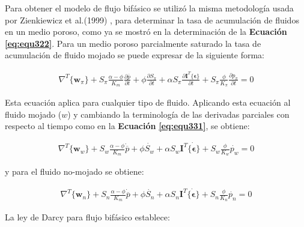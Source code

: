 Para obtener el modelo de flujo bifásico se utilizó la misma metodología usada por Zienkiewicz et al.(1999) \cite{Zienkiewicz1999ComputationalGeomechanics}, para determinar la tasa de acumulación de fluidos en un medio poroso, como ya se mostró en la determinación de la \textbf{Ecuación} \textbf{\ref{eq:equ322}}. Para un medio poroso parcialmente saturado la tasa de acumulación de fluido mojado se puede expresar de la siguiente forma:
\bigskip
\begin{ceqn} %
\begin{gather}\label{eq:equ339}
\nabla^T \{\mathbf{w}_{\pi}\} + S_{\pi} \frac{\alpha - \phi}{K_m}\frac{\partial \overline{p}}{\partial t} + \phi\frac{\partial S_{\pi}}{\partial t} + \alpha S_{\pi}\frac{\partial\mathbf{I}^T \{\mathbf{\epsilon}\}}{\partial t} + S_{\pi}\frac{\phi}{K_{\pi}}\frac{\partial p_{\pi}}{\partial t} = 0
\end{gather}   
\end{ceqn}
\bigskip

Esta ecuación aplica para cualquier tipo de fluido. Aplicando esta ecuación al fluido mojado ($w$) y cambiando la terminología de las derivadas parciales con respecto al tiempo como en la \textbf{Ecuación} \textbf{\ref{eq:equ331}}, se obtiene:

\begin{ceqn} %
\begin{gather}\label{eq:equ340}
\nabla^T \{\mathbf{w}_{w}\} + S_{w} \frac{\alpha - \phi}{K_m}\dot{\overline{p}}+ \phi\dot{S_{w}} + \alpha S_{w}\mathbf{I}^T \dot{\{\mathbf{\epsilon}\}} + S_{w}\frac{\phi}{K_{w}}\dot{p_{w}} = 0
\end{gather}   
\end{ceqn}

y para el fluido no-mojado se obtiene:

\begin{ceqn} %
\begin{gather}\label{eq:equ341}
\nabla^T \{\mathbf{w}_{n}\} + S_{n} \frac{\alpha - \phi}{K_m}\dot{\overline{p}}+ \phi\dot{S_{n}} + \alpha S_{n}\mathbf{I}^T \dot{\{\mathbf{\epsilon}\}} + S_{n}\frac{\phi}{K_{n}}\dot{p_{n}} = 0
\end{gather}   
\end{ceqn}
\bigskip
La ley de Darcy \cite{Zienkiewicz1999ComputationalGeomechanics} para flujo bifásico establece:

